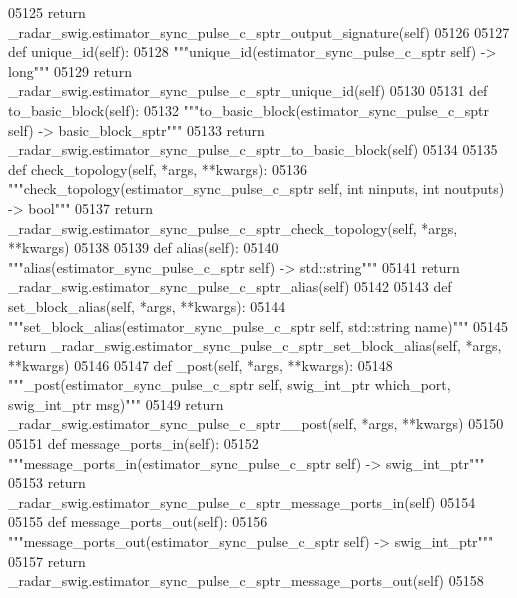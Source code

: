\begin{DoxyCode}
{{{{{{{{{{{{{{{{{05125         \textcolor{keywordflow}{return} \_radar\_swig.estimator\_sync\_pulse\_c\_sptr\_output\_signature(self)
05126 
05127     \textcolor{keyword}{def }unique_id(self):
05128         \textcolor{stringliteral}{"""unique\_id(estimator\_sync\_pulse\_c\_sptr self) -> long"""}
05129         \textcolor{keywordflow}{return} \_radar\_swig.estimator\_sync\_pulse\_c\_sptr\_unique\_id(self)
05130 
05131     \textcolor{keyword}{def }to_basic_block(self):
05132         \textcolor{stringliteral}{"""to\_basic\_block(estimator\_sync\_pulse\_c\_sptr self) -> basic\_block\_sptr"""}
05133         \textcolor{keywordflow}{return} \_radar\_swig.estimator\_sync\_pulse\_c\_sptr\_to\_basic\_block(self)
05134 
05135     \textcolor{keyword}{def }check_topology(self, *args, **kwargs):
05136         \textcolor{stringliteral}{"""check\_topology(estimator\_sync\_pulse\_c\_sptr self, int ninputs, int noutputs) -> bool"""}
05137         \textcolor{keywordflow}{return} \_radar\_swig.estimator\_sync\_pulse\_c\_sptr\_check\_topology(self, *args, **kwargs)
05138 
05139     \textcolor{keyword}{def }alias(self):
05140         \textcolor{stringliteral}{"""alias(estimator\_sync\_pulse\_c\_sptr self) -> std::string"""}
05141         \textcolor{keywordflow}{return} \_radar\_swig.estimator\_sync\_pulse\_c\_sptr\_alias(self)
05142 
05143     \textcolor{keyword}{def }set_block_alias(self, *args, **kwargs):
05144         \textcolor{stringliteral}{"""set\_block\_alias(estimator\_sync\_pulse\_c\_sptr self, std::string name)"""}
05145         \textcolor{keywordflow}{return} \_radar\_swig.estimator\_sync\_pulse\_c\_sptr\_set\_block\_alias(self, *args, **kwargs)
05146 
05147     \textcolor{keyword}{def }_post(self, *args, **kwargs):
05148         \textcolor{stringliteral}{"""\_post(estimator\_sync\_pulse\_c\_sptr self, swig\_int\_ptr which\_port, swig\_int\_ptr msg)"""}
05149         \textcolor{keywordflow}{return} \_radar\_swig.estimator\_sync\_pulse\_c\_sptr\_\_post(self, *args, **kwargs)
05150 
05151     \textcolor{keyword}{def }message_ports_in(self):
05152         \textcolor{stringliteral}{"""message\_ports\_in(estimator\_sync\_pulse\_c\_sptr self) -> swig\_int\_ptr"""}
05153         \textcolor{keywordflow}{return} \_radar\_swig.estimator\_sync\_pulse\_c\_sptr\_message\_ports\_in(self)
05154 
05155     \textcolor{keyword}{def }message_ports_out(self):
05156         \textcolor{stringliteral}{"""message\_ports\_out(estimator\_sync\_pulse\_c\_sptr self) -> swig\_int\_ptr"""}
05157         \textcolor{keywordflow}{return} \_radar\_swig.estimator\_sync\_pulse\_c\_sptr\_message\_ports\_out(self)
05158 
}}}}}}}}}}}}}}}}}
\end{DoxyCode}
